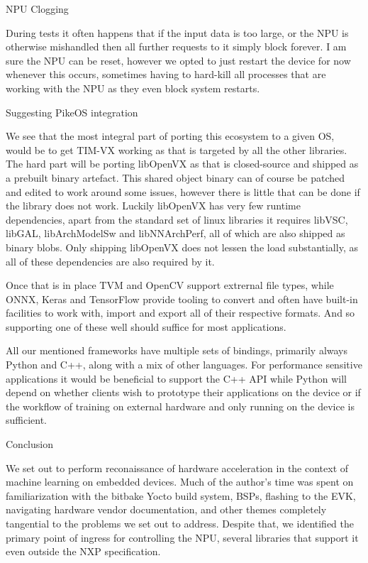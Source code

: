 
\secc NPU Clogging

During tests it often happens that if the input data
is too large, or the NPU is otherwise mishandled
then all further requests to it simply
block forever.
I am sure the NPU can be reset,
however we opted to just restart the device for now
whenever this occurs,
sometimes having to hard-kill all processes that
are working with the NPU as they even block system restarts.

\chap Suggesting PikeOS integration

We see that the most integral part of
porting this ecosystem to a given OS,
would be to get TIM-VX working as
that is targeted by all the other
libraries.
The hard part will be porting libOpenVX
as that is closed-source and shipped as a prebuilt
binary artefact.
This shared object binary can of course be patched
and edited to work around some issues,
however there is little that can be done
if the library does not work.
Luckily libOpenVX has very few runtime dependencies,
apart from the standard set of linux libraries
it requires libVSC, libGAL, libArchModelSw and libNNArchPerf,
all of which are also shipped as binary blobs.
Only shipping libOpenVX does not lessen the load substantially,
as all of these dependencies are also required by it.

Once that is in place TVM and OpenCV support extrernal
file types,
while ONNX, Keras and TensorFlow
provide tooling to convert and
often have built-in facilities to work with,
import and export
all of their respective formats.
And so supporting one of these well should
suffice for most applications.

All our mentioned frameworks have multiple sets of bindings,
primarily always Python and C++, along with a mix of other languages.
For performance sensitive applications it would be beneficial
to support the C++ API while Python will depend on
whether clients wish to prototype their applications
on the device or if the workflow
of training on external hardware and only running on the device
is sufficient.

\chap Conclusion

We set out to perform reconaissance of
hardware acceleration
in the context of machine learning on embedded devices.
Much of the author's time was spent
on familiarization with the bitbake Yocto build system,
BSPs,
flashing to the EVK,
navigating hardware vendor documentation,
and other themes completely tangential
to the problems we set out to address.
Despite that, we identified the primary
point of ingress for controlling the NPU,
several libraries that support it
even outside the NXP specification.

